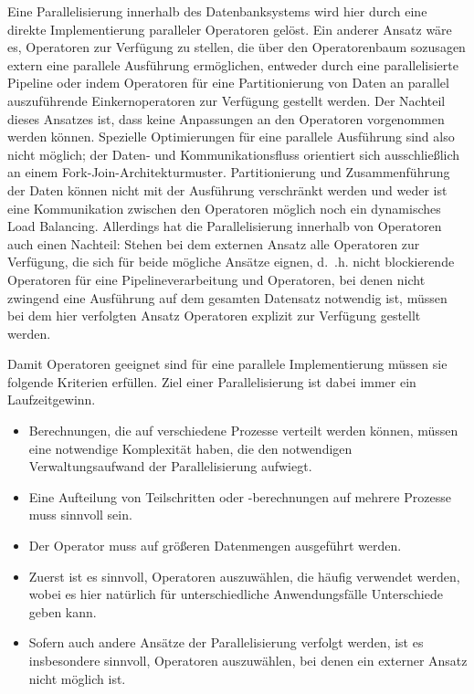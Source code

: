 \documentclass[a4paper,12pt,twoside]{article}
\begin{document}
Eine Parallelisierung innerhalb des Datenbanksystems wird hier durch eine direkte Implementierung paralleler Operatoren gelöst. Ein anderer Ansatz wäre es, Operatoren zur Verfügung zu stellen, die über den Operatorenbaum sozusagen extern eine parallele Ausführung ermöglichen, entweder durch eine parallelisierte Pipeline oder indem Operatoren für eine Partitionierung von Daten an parallel auszuführende Einkernoperatoren zur Verfügung gestellt werden. Der Nachteil dieses Ansatzes ist, dass keine Anpassungen an den Operatoren vorgenommen werden können. Spezielle Optimierungen für eine parallele Ausführung sind also nicht möglich; der Daten- und Kommunikationsfluss orientiert sich ausschließlich an einem Fork-Join-Architekturmuster. Partitionierung und Zusammenführung der Daten können nicht mit der Ausführung verschränkt werden und weder ist eine Kommunikation zwischen den Operatoren möglich noch ein dynamisches Load Balancing. Allerdings hat die Parallelisierung innerhalb von Operatoren auch einen Nachteil: Stehen bei dem externen Ansatz alle Operatoren zur Verfügung, die sich für beide mögliche Ansätze eignen, d.~.h. nicht blockierende Operatoren für eine Pipelineverarbeitung und Operatoren, bei denen nicht zwingend eine Ausführung auf dem gesamten Datensatz notwendig ist, müssen bei dem hier verfolgten Ansatz Operatoren explizit zur Verfügung gestellt werden.  

Damit Operatoren geeignet sind für eine parallele Implementierung müssen sie folgende Kriterien erfüllen. Ziel einer Parallelisierung ist dabei immer ein Laufzeitgewinn.

\begin{itemize}
	\item Berechnungen, die auf verschiedene Prozesse verteilt werden können, müssen eine notwendige Komplexität haben, die den notwendigen Verwaltungsaufwand der Parallelisierung aufwiegt.
	\item Eine Aufteilung von Teilschritten oder -berechnungen auf mehrere Prozesse muss sinnvoll sein.
	\item Der Operator muss auf größeren Datenmengen ausgeführt werden.
	\item Zuerst ist es sinnvoll, Operatoren auszuwählen, die häufig verwendet werden, wobei es hier natürlich für unterschiedliche Anwendungsfälle Unterschiede geben kann.
	\item Sofern auch andere Ansätze der Parallelisierung verfolgt werden, ist es insbesondere sinnvoll, Operatoren auszuwählen, bei denen ein externer Ansatz nicht möglich ist.
\end{itemize}
\end{document}
